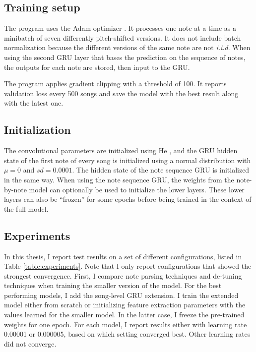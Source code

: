 \subsection{Training setup}
The program uses the Adam optimizer \cite{kingma2014adam}. It processes one note at a time as a minibatch of seven differently pitch-shifted versions. It does not include batch normalization because the different versions of the same note are not \textit{i.i.d}. When using the second GRU layer that bases the prediction on the sequence of notes, the outputs for each note are stored, then input to the GRU. 

The program applies gradient clipping \cite{pascanu2013difficulty} with a threshold of 100. It reports validation loss every 500 songs and save the model with the best result along with the latest one. 
\subsection{Initialization}
The convolutional parameters are initialized using He \cite{he2015delving}, and the GRU hidden state of the first note of every song is initialized using a normal distribution with $\mu=0$ and $sd=0.0001$. The hidden state of the note sequence GRU is initialized in the same way. When using the note sequence GRU, the weights from the note-by-note model can optionally be used to initialize the lower layers. These lower layers can also be ``frozen'' for some epochs before being trained in the context of the full model. 

\subsection{Experiments}
\label{sec:experiment-list}
In this thesis, I report test results on a set of different configurations, listed in Table \ref{table:experiments}. Note that I only report configurations that showed the strongest convergence. First, I compare note parsing techniques and de-tuning techniques when training the smaller version of the model. For the best performing models, I add the song-level GRU extension. I train the extended model either from scratch or initializing feature extraction parameters with the values learned for the smaller model. In the latter case, I freeze the pre-trained weights for one epoch. For each model, I report results either with learning rate 0.00001 or 0.000005, based on which setting converged best. Other learning rates did not converge.

